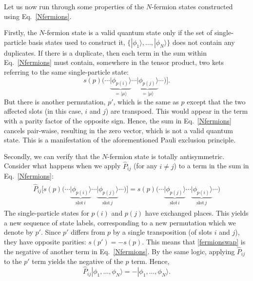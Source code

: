 \documentclass[pra,12pt]{revtex4-2}
\begin{document}
Let us now run through some properties of the $N$-fermion states
constructed using Eq.~\eqref{Nfermions}.

Firstly, the $N$-fermion state is a valid quantum state only if the
set of single-particle basis states used to construct it,
$\{|\phi_1\rangle, \dots, |\phi_N\rangle\}$ does not contain any
duplicates.  If there is a duplicate, then each term in the sum within
Eq.~\eqref{Nfermions} must contain, somewhere in the tensor product,
two kets referring to the same single-particle state:
\begin{equation*}
s(p)\big( \cdots
      \underbrace{|\phi_{p(i)}\rangle}_{= |\mu\rangle} \cdots
      \underbrace{|\phi_{p(j)}\rangle}_{= |\mu\rangle} \cdots \big)\Big].
\end{equation*}
But there is another permutation, $p'$, which is the same as $p$
except that the two affected slots (in this case, $i$ and $j$) are
transpoed.  This would appear in the term with a parity factor of the
opposite sign.  Hence, the sum in Eq.~\eqref{Nfermions} cancels
pair-waise, resulting in the zero vector, which is not a valid quantum
state.  This is a manifestation of the aforementioned Pauli exclusion
principle.

Secondly, we can verify that the $N$-fermion state is totally
antisymmetric.  Consider what happens when we apply $\hat{P}_{ij}$
(for any $i \ne j$) to a term in the sum in Eq.~\eqref{Nfermions}:
\begin{align}
  \begin{aligned}
    \hat{P}_{ij} \Big[s(p)\big( \cdots
      \underbrace{|\phi_{p(i)}\rangle}_{\textrm{slot}\,i} \cdots
      \underbrace{|\phi_{p(j)}\rangle}_{\textrm{slot}\,j} \cdots \big)\Big]
    = s(p)\big( \cdots
      \underbrace{|\phi_{p(j)}\rangle}_{\textrm{slot}\,i} \cdots
      \underbrace{|\phi_{p(i)}\rangle}_{\textrm{slot}\,j} \cdots \big)
  \end{aligned}
  \label{fermionswap}
\end{align}
The single-particle states for $p(i)$ and $p(j)$ have exchanged
places.  This yields a new sequence of state labels, corresponding to
a new permutation which we denote by $p'$.  Since $p'$ differs from
$p$ by a single transposition (of slots $i$ and $j$), they have
opposite parities: $s(p') = - s(p)$.  This means that
\eqref{fermionswap} is the negative of another term in
Eq.~\eqref{Nfermions}.  By the same logic, applying $\hat{P}_{ij}$ to
the $p'$ term yields the negative of the $p$ term.  Hence,
\begin{equation}
  \hat{P}_{ij} |\phi_1,\dots,\phi_N\rangle = - |\phi_1,\dots,\phi_N\rangle.
\end{equation}
\end{document}
